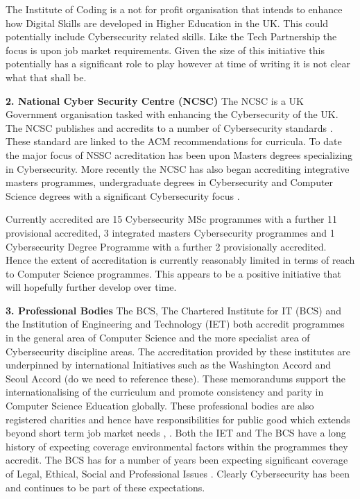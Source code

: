 \documentclass[sigconf,anonymous]{acmart}
\begin{document}
The Institute of Coding is a not for profit organisation that intends to enhance how Digital Skills are developed in Higher Education in the UK. This could potentially include Cybersecurity related skills. Like the Tech Partnership the focus is upon job market requirements.  Given the size of this initiative this potentially has a significant role to play however at time of writing it is not clear what that shall be.

\textbf{2. National Cyber Security Centre (NCSC)}
The NCSC is a UK Government organisation tasked with enhancing the Cybersecurity of the UK. The NCSC publishes and accredits to a number of Cybersecurity standards \cite{NCSC2018a}. These standard are linked to the ACM recommendations for curricula. To date the major focus of NSSC acreditation has been upon Masters degrees specializing in Cybersecurity. More recently the NCSC has also began accrediting integrative masters programmes, undergraduate degrees in Cybersecurity and Computer Science degrees with a significant Cybersecurity focus \cite{NCSC2018b}.

Currently accredited are 15 Cybersecurity MSc programmes with a further 11 provisional accredited, 3 integrated masters Cybersecurity programmes and 1 Cybersecurity Degree Programme with a further 2 provisionally accredited. Hence the extent of accreditation is currently reasonably limited in terms of reach to Computer Science programmes. This appears to be a positive initiative that will hopefully further develop over time. 

\textbf{3. Professional Bodies}
The BCS, The Chartered Institute for IT (BCS) and the Institution of Engineering and Technology (IET) both accredit programmes in the general area of Computer Science and the more specialist area of Cybersecurity discipline areas. The accreditation provided by these institutes are underpinned by international Initiatives such as the Washington Accord and Seoul Accord (do we need to reference these). These memorandums support the internationalising of the curriculum and promote consistency and parity in Computer Science Education globally.   These professional bodies are also registered charities and hence have responsibilities for public good which extends beyond short term job market needs \cite{Stensaker2006}, \cite{Mutereko2017}. Both the IET and The BCS have a long history of expecting coverage environmental factors within the programmes they accredit. The BCS has for a number of years been expecting significant coverage of Legal, Ethical, Social and Professional Issues \cite{Brooke2018}. Clearly Cybersecurity has been and continues to be part of these expectations. 
\end{document}
